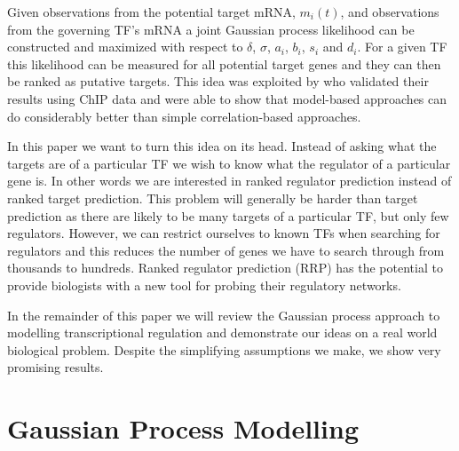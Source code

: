 \documentclass{article}
\begin{document}
Given  observations  from the  potential  target  mRNA, $m_i(t)$,  and
observations  from the  governing TF's  mRNA a  joint  Gaussian process
likelihood can be constructed  and maximized with respect to $\delta$,
$\sigma$,  $a_i$,  $b_i$,  $s_i$  and  $d_i$.  For  a  given  TF  this
likelihood can be measured for all potential target genes and they can
then  be ranked  as  putative  targets.  This  idea  was exploited  by
\cite{Honkela:modelbased10}  who validated  their  results using  ChIP
data  and  were  able to  show  that  model-based approaches  can  do
considerably better than simple correlation-based approaches.

In this paper we want to turn this idea on its head. Instead of asking
what  the targets are  of a  particular TF  we wish  to know  what the
regulator of a particular gene is. In other words we are interested in
ranked regulator prediction instead  of ranked target prediction. This
problem will generally  be harder than target prediction  as there are
likely to be many targets of a particular TF, but only few regulators.
However, we  can restrict  ourselves to known  TFs when  searching for
regulators  and this reduces  the number  of genes  we have  to search
through from thousands to hundreds.  Ranked regulator prediction (RRP)
has the  potential to provide biologists  with a new  tool for probing
their regulatory networks.

In the  remainder of  this paper we  will review the  Gaussian process
approach to  modelling transcriptional regulation  and demonstrate our
ideas  on a  real world  biological problem.  Despite  the simplifying
assumptions we make, we show very promising results.

\section{Gaussian Process Modelling}
\end{document}
